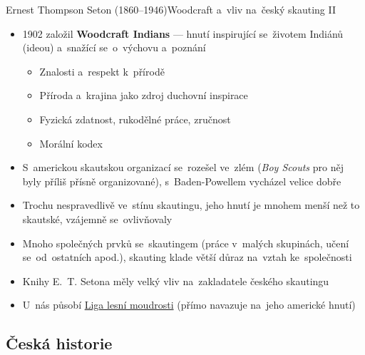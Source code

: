 \documentclass[compress, ucs, xelatex, 11pt, xcolor=dvipsnames, print, aspectratio=169,
	hyperref={
		bookmarks=true,
		unicode=true,
		colorlinks=true,
		pdftitle={Skautska vychovna metoda},
		plainpages=false,
		pdfauthor={Vojtech Zeisek},
		pdfsubject={Skautska vychovna metoda a jeji vyvoj za posledni stoleti a desetileti},
		pdfcreator={XeLaTeX},
		pdfkeywords={Junak, Pedagogika, Skaut, Skauting, Vychovna metoda},
		linkcolor=Red, %
		anchorcolor=ForestGreen, %
		citecolor=ForestGreen, %
		filecolor=ForestGreen, %
		menucolor=ForestGreen, %
		urlcolor=Sepia, %
		pdftex},
	url={hyphens, lowtilde} %
	]{beamer}
\begin{document}
\begin{frame}{Ernest Thompson Seton (1860--1946)}{Woodcraft a~vliv na~český skauting II}
	\begin{itemize}
		\item 1902 založil \textbf{Woodcraft Indians} --- hnutí inspirující se~životem Indiánů (ideou) a~snažící se~o~výchovu a~poznání
		\begin{itemize}
			\item Znalosti a~respekt k~přírodě
			\item Příroda a~krajina jako zdroj duchovní inspirace
			\item Fyzická zdatnost, rukodělné práce, zručnost
			\item Morální kodex
		\end{itemize}
		\item S~americkou skautskou organizací se~rozešel ve~zlém (\textit{Boy Scouts} pro něj byly příliš přísně organizované), s~Baden-Powellem vycházel velice dobře
		\item Trochu nespravedlivě ve~stínu skautingu, jeho hnutí je mnohem menší než to skautské, vzájemně se~ovlivňovaly
		\item Mnoho společných prvků se~skautingem (práce v~malých skupinách, učení se~od~ostatních apod.), skauting klade větší důraz na~vztah ke~společnosti
		\item Knihy E.~T. Setona měly velký vliv na~zakladatele českého skautingu
		\item U~nás působí \href{https://www.woodcraft.cz/}{Liga lesní moudrosti} (přímo navazuje na~jeho americké hnutí)
	\end{itemize}
\end{frame}

\subsection{Česká historie}
\end{document}
